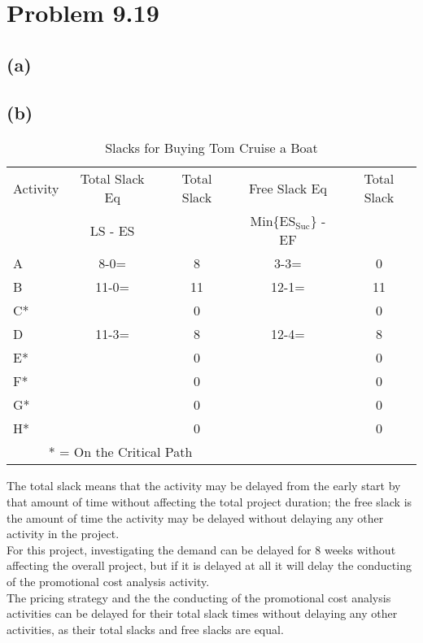 \documentclass{article}
\begin{document}
	\section*{Problem 9.19}
	\subsection*{(a)}
	\begin{center}
	\makebox[\textwidth]{
		}
	\end{center}
	\pagebreak
	\subsection*{(b)}
		{\renewcommand{\arraystretch}{1.2} 
	\begin{table}[h!tbp]
  		\begin{center}
    		\caption{Slacks for Buying Tom Cruise a Boat}
    		\label{tab:table1}
			
    		\begin{tabular}{lcccc}
				Activity & Total Slack Eq & Total Slack & Free Slack Eq & Total Slack\\
				& LS - ES & & Min\{ES$_{\text{Suc}}$\} - EF & \\
				\hline
      			A & 8-0= & 8 & 3-3=& 0\\
      			B & 11-0= & 11 & 12-1= & 11\\
				C* && 0 && 0\\
				D & 11-3= & 8 & 12-4= & 8\\
				E* && 0 && 0\\
				F* && 0 && 0\\
				G* && 0 && 0\\
				H* && 0 && 0\\
				\hline
				\multicolumn{3}{c}{* = On the Critical Path}\\
    		\end{tabular}
  		\end{center}
	\end{table}
	}
	
	The total slack means that the activity may be delayed from the early start by that amount of time without affecting the total project duration; the free slack is the amount of time the activity may be delayed without delaying any other activity in the project.\\
	For this project, investigating the demand can be delayed for 8 weeks without affecting the overall project, but if it is delayed at all it will delay the conducting of the promotional cost analysis activity.\\
	The pricing strategy and the the conducting of the promotional cost analysis activities can be delayed for their total slack times without delaying any other activities, as their total slacks and free slacks are equal.
	
\end{document}
